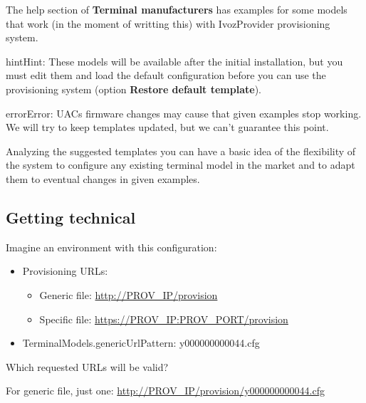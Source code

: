 \documentclass[letterpaper,10pt,english]{sphinxmanual}
\begin{document}
The help section of \textbf{Terminal manufacturers} has examples for some models
that work (in the moment of writting this) with IvozProvider provisioning system.

\begin{notice}{hint}{Hint:}
These models will be available after the initial installation, but
you must edit them and load the default configuration before
you can use the provisioning system (option \textbf{Restore default template}).
\end{notice}

\begin{notice}{error}{Error:}
UACs firmware changes may cause that given examples stop working. We
will try to keep templates updated, but we can't guarantee this point.
\end{notice}

Analyzing the suggested templates you can have a basic idea of the flexibility of
the system to configure any existing terminal model in the market and to adapt
them to eventual changes in given examples.


\subsection{Getting technical}
\label{platform/terminal_provisioning:getting-technical}
Imagine an environment with this configuration:
\begin{itemize}
\item {} 
Provisioning URLs:
\begin{itemize}
\item {} 
Generic file: \url{http://PROV\_IP/provision}

\item {} 
Specific file: \url{https://PROV\_IP:PROV\_PORT/provision}

\end{itemize}

\item {} 
TerminalModels.genericUrlPattern: y000000000044.cfg

\end{itemize}

Which requested URLs will be valid?

For generic file, just one: \url{http://PROV\_IP/provision/y000000000044.cfg}
\end{document}
